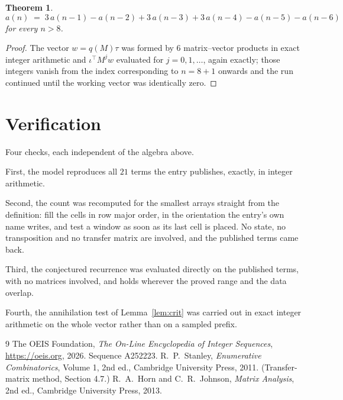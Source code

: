 \documentclass[11pt,a4paper]{article}
\theoremstyle{plain}
\newtheorem{theorem}{Theorem}
\theoremstyle{definition}
\begin{document}
\begin{theorem}
\[
a(n)\;=\;3\,a(n-1) - a(n-2) + 3\,a(n-3) + 3\,a(n-4) - a(n-5) - a(n-6)
\]
for every $n>8$.
\end{theorem}

\begin{proof}
The vector $w=q(M)\tau$ was formed by $6$ matrix--vector products in exact integer
arithmetic and $\iota^{\!\top}M^{j}w$ evaluated for $j=0,1,\dots$, again exactly; those
integers vanish from the index corresponding to $n=8+1$ onwards and the run continued
until the working vector was identically zero.
\end{proof}

\section{Verification}

Four checks, each independent of the algebra above.

First, the model reproduces all $21$ terms the entry publishes, exactly, in integer
arithmetic.

Second, the count was recomputed for the smallest arrays straight from the definition: fill the
cells in row major order, in the orientation the entry's own name writes, and test a window as
soon as its last cell is placed. No state, no transposition and no transfer matrix are
involved, and the published terms came back.

Third, the conjectured recurrence was evaluated directly on the published terms, with no
matrices involved, and holds wherever the proved range and the data overlap.

Fourth, the annihilation test of Lemma~\ref{lem:crit} was carried out in exact integer
arithmetic on the whole vector rather than on a sampled prefix.

\begin{thebibliography}{9}
 The OEIS Foundation, \emph{The On-Line Encyclopedia of Integer
Sequences}, \url{https://oeis.org}, 2026. Sequence A252223.
 R.~P.~Stanley, \emph{Enumerative Combinatorics}, Volume 1, 2nd ed.,
Cambridge University Press, 2011. (Transfer-matrix method, Section 4.7.)
 R.~A.~Horn and C.~R.~Johnson, \emph{Matrix Analysis}, 2nd ed., Cambridge
University Press, 2013.
\end{thebibliography}
\end{document}
